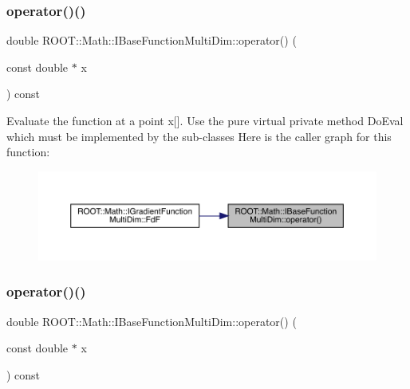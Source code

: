 \subsubsection{\texorpdfstring{operator()()}{operator()()}\hspace{0.1cm}{\footnotesize\ttfamily [1/3]}}
{\footnotesize\ttfamily double R\+O\+O\+T\+::\+Math\+::\+I\+Base\+Function\+Multi\+Dim\+::operator() (\begin{DoxyParamCaption}\item[{const double $\ast$}]{x }\end{DoxyParamCaption}) const\hspace{0.3cm}{\ttfamily [inline]}}

Evaluate the function at a point x\mbox{[}\mbox{]}. Use the pure virtual private method Do\+Eval which must be implemented by the sub-\/classes Here is the caller graph for this function\+:
\nopagebreak
\begin{figure}[H]
\begin{center}
\leavevmode
\includegraphics[width=350pt]{d0/d87/classROOT_1_1Math_1_1IBaseFunctionMultiDim_a7efd1892dc6473b3f8aaaff3cbb8bb2f_icgraph}
\end{center}
\end{figure}
\mbox{\label{classROOT_1_1Math_1_1IBaseFunctionMultiDim_a7efd1892dc6473b3f8aaaff3cbb8bb2f}} 
\subsubsection{\texorpdfstring{operator()()}{operator()()}\hspace{0.1cm}{\footnotesize\ttfamily [2/3]}}
{\footnotesize\ttfamily double R\+O\+O\+T\+::\+Math\+::\+I\+Base\+Function\+Multi\+Dim\+::operator() (\begin{DoxyParamCaption}\item[{const double $\ast$}]{x }\end{DoxyParamCaption}) const\hspace{0.3cm}{\ttfamily [inline]}}


